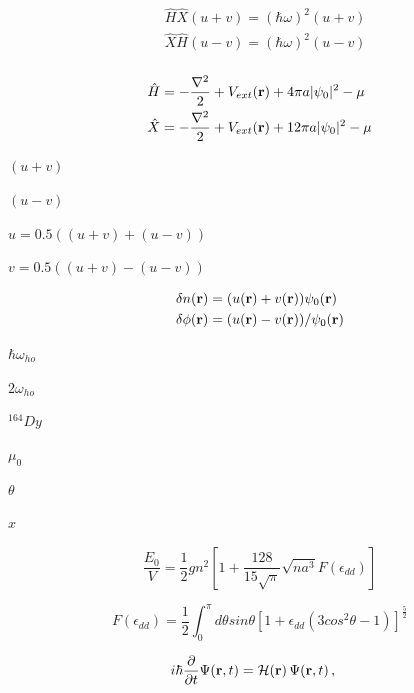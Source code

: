 \documentclass{article}
\begin{document}
\[
 \begin{align}
     & \hat{H}\hat{X} (u+v) = (\hbar\omega)^2 (u+v) \nonumber \\
     & \hat{X}\hat{H} (u-v) = (\hbar\omega)^2 (u-v) \nonumber \\
 \end{align}
\]
\pagebreak

\[
 \begin{align}
     & \hat{H} = -\frac{\nabla^2}{2} + V_{ext}({\bf r}) + 4  \pi a |\psi_0|^2 - \mu\nonumber \\
     & \hat{X} = -\frac{\nabla^2}{2} + V_{ext}({\bf r}) + 12 \pi a |\psi_0|^2 - \mu \nonumber \\
 \end{align}
\]
\pagebreak

$(u+v)$
\pagebreak

$(u-v)$
\pagebreak

$ u = 0.5 \left( (u+v) + (u-v) \right)$
\pagebreak

$ v = 0.5 \left( (u+v) - (u-v) \right)$
\pagebreak

\[

\begin{align}

    & \delta n({\bf r}) = (u({\bf r}) + v({\bf r}))\psi_0({\bf r}) \nonumber \\
    & \delta \phi({\bf r}) = (u({\bf r}) - v({\bf r}))/\psi_0({\bf r}) \nonumber \\

\end{align}

\]
\pagebreak

$ \hbar \omega_{ho} $
\pagebreak

$ 2\omega_{ho} $
\pagebreak

$ ^{164}Dy $
\pagebreak

$ \mu_0 $
\pagebreak

$ \theta $
\pagebreak

$ x $
\pagebreak

\[
 \frac{E_0}{V}=\frac{1}{2}gn^2\left[1+\frac{128}{15\sqrt{\pi}}\sqrt{na^3}F(\epsilon_{dd})\right]
\]
\pagebreak

\[
 F(\epsilon_{dd})=\frac{1}{2}\int_0^{\pi}d\theta sin\theta[1+\epsilon_{dd}(3cos^2\theta-1)]^{\frac{5}{2}}
\]
\pagebreak

\[
\begin{align}
 &i\hbar\frac{\partial}{\partial t}  \Psi({\bf r},t)= \mathcal{H}({\bf r})\,\Psi({\bf r},t)\,,
\end{align}
\]
\pagebreak
\end{document}
